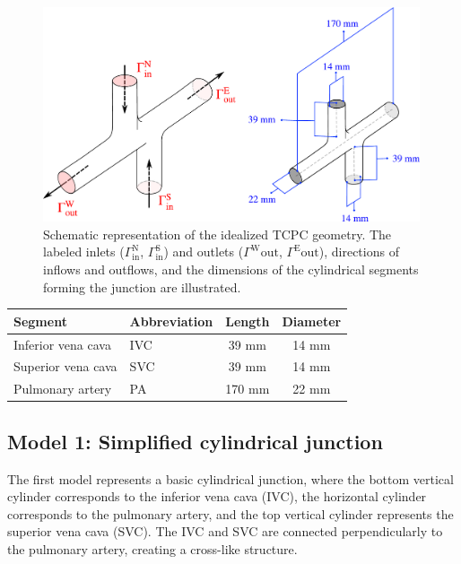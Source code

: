 \begin{figure}[H]
	\centering
	\vspace{2mm}
	\includegraphics[width=0.99\textwidth]{figures/3d-tcpc-schema-combined.pdf}
	\vspace{7mm}
	\caption{Schematic representation of the idealized TCPC geometry. The labeled inlets ($\Gamma^{\text{N}}_{\text{in}}$, $\Gamma^{\text{S}}_{\text{in}}$) and outlets ($\Gamma^{\text{W}}{\text{out}}$, $\Gamma^{\text{E}}{\text{out}}$), directions of inflows and outflows, and the dimensions of the cylindrical segments forming the junction are illustrated.}
	\label{fig:junction schema}
\end{figure}

\bgroup
\centering
\vspace{2mm}
\setlength\tabcolsep{3mm}
\def\arraystretch{1.7}%
\begin{tabular}{|l|l|c|c|}
	\hline
	Segment & Abbreviation & Length & Diameter \\ \hline
	Inferior vena cava 	& IVC 	&      39 mm        &     14 mm    \\ 
	Superior vena cava  & SVC 	&      39 mm     	&     14 mm     \\ 
	Pulmonary artery 	& PA 	&      170 mm     	&     22 mm     \\  \hline
\end{tabular}
\vspace{2mm}
\label{tab:tcpc dims}
\egroup

\subsection*{Model 1: Simplified cylindrical junction}

The first model represents a basic cylindrical junction, where the bottom vertical cylinder corresponds to the inferior vena cava (IVC), the horizontal cylinder corresponds to the pulmonary artery, and the top vertical cylinder represents the superior vena cava (SVC). The IVC and SVC are connected perpendicularly to the pulmonary artery, creating a cross-like structure. 

